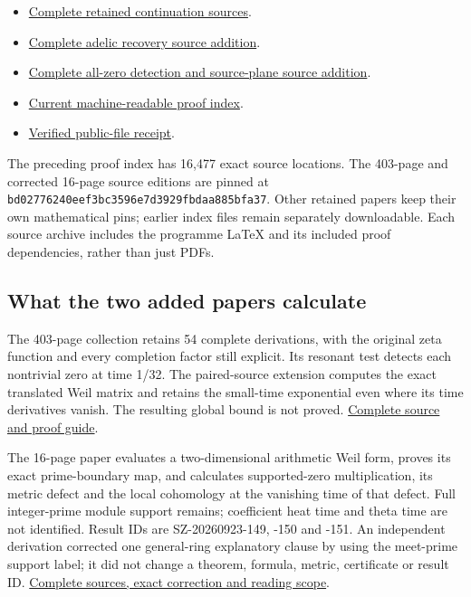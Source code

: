 \documentclass[
]{article}
\providecommand{\tightlist}{%
  \setlength{\itemsep}{0pt}\setlength{\parskip}{0pt}}
\begin{document}
\begin{itemize}
\tightlist
\item
  \href{https://zenodo.org/records/22920941/files/008-splitzero-continuation-complete-sources.zip?download=1}{Complete
  retained continuation sources}.
\item
  \href{https://zenodo.org/records/22920941/files/011-splitzero-adelic-recovery-complete-sources.zip?download=1}{Complete
  adelic recovery source addition}.
\item
  \href{https://zenodo.org/records/22920941/files/015-splitzero-endpoint-and-source-plane-complete-sources.zip?download=1}{Complete
  all-zero detection and source-plane source addition}.
\item
  \href{https://zenodo.org/records/22920941/files/016-splitzero-pinned-proof-index.json?download=1}{Current
  machine-readable proof index}.
\item
  \href{PUBLICATION_RECEIPT.json}{Verified public-file receipt}.
\end{itemize}

The preceding proof index has 16,477 exact source locations. The
403-page and corrected 16-page source editions are pinned at
\texttt{bd02776240eef3bc3596e7d3929fbdaa885bfa37}. Other retained papers
keep their own mathematical pins; earlier index files remain separately
downloadable. Each source archive includes the programme LaTeX and its
included proof dependencies, rather than just PDFs.

\subsection{What the two added papers
calculate}\label{what-the-two-added-papers-calculate}

The 403-page collection retains 54 complete derivations, with the
original zeta function and every completion factor still explicit. Its
resonant test detects each nontrivial zero at time 1/32. The
paired-source extension computes the exact translated Weil matrix and
retains the small-time exponential even where its time derivatives
vanish. The resulting global bound is not proved.
\href{https://github.com/KokunoYumeto/zeta-function-research-reader/blob/bd02776240eef3bc3596e7d3929fbdaa885bfa37/workbenches/splitzero-tandem/branches/tau-zero-prime-positivity/PUBLICATION_COMPANION.md}{Complete
source and proof guide}.

The 16-page paper evaluates a two-dimensional arithmetic Weil form,
proves its exact prime-boundary map, and calculates supported-zero
multiplication, its metric defect and the local cohomology at the
vanishing time of that defect. Full integer-prime module support
remains; coefficient heat time and theta time are not identified. Result
IDs are SZ-20260923-149, -150 and -151. An independent derivation
corrected one general-ring explanatory clause by using the meet-prime
support label; it did not change a theorem, formula, metric, certificate
or result ID.
\href{https://github.com/KokunoYumeto/zeta-function-research-reader/blob/bd02776240eef3bc3596e7d3929fbdaa885bfa37/workbenches/splitzero-tandem/continuations/20260923-retained-source-readers/two-source-supported-zero/PUBLICATION_READING.md}{Complete
sources, exact correction and reading scope}.
\end{document}
